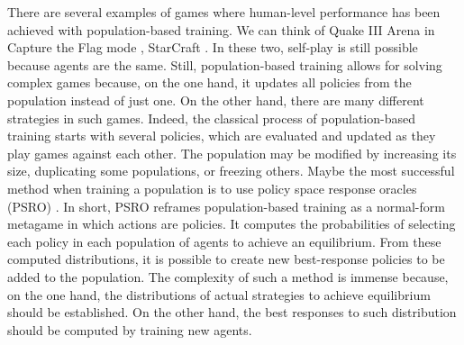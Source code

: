 There are several examples of games where human-level performance has been achieved with population-based training.
We can think of Quake III Arena in Capture the Flag mode \citep{jaderberg2019human}, StarCraft \citep{vinyals2019grandmaster}.
In these two, self-play is still possible because agents are the same.
Still, population-based training allows for solving complex games because, on the one hand, it updates all policies from the population instead of just one.
On the other hand, there are many different strategies in such games.
Indeed, the classical process of population-based training starts with several policies, which are evaluated and updated as they play games against each other.
The population may be modified by increasing its size, duplicating some populations, or freezing others.
Maybe the most successful method when training a population is to use policy space response oracles (PSRO) \citep{NIPS2017_3323fe11, Muller2020A}.
In short, PSRO reframes population-based training as a normal-form metagame in which actions are policies.
It computes the probabilities of selecting each policy in each population of agents to achieve an equilibrium.
From these computed distributions, it is possible to create new best-response policies to be added to the population.
The complexity of such a method is immense because, on the one hand, the distributions of actual strategies to achieve equilibrium should be established.
On the other hand, the best responses to such distribution should be computed by training new agents.